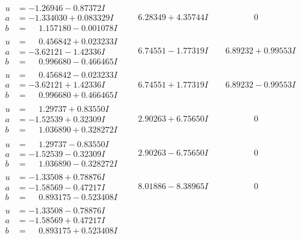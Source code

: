 \documentclass[1p]{elsarticle_modified}
\theoremstyle{definition}
\begin{document}
$$\begin{array}{c|c|c}
\begin{aligned}
u &= -1.26946 - 0.87372 I \\
a &= -1.334030 + 0.083329 I \\
b &= \phantom{-}1.157180 - 0.001078 I\end{aligned}
 & \phantom{-}6.28349 + 4.35744 I & \phantom{-0.000000 } 0 \\ \hline\begin{aligned}
u &= \phantom{-}0.456842 + 0.023233 I \\
a &= -3.62121 - 1.42336 I \\
b &= \phantom{-}0.996680 - 0.466465 I\end{aligned}
 & \phantom{-}6.74551 - 1.77319 I & \phantom{-}6.89232 + 0.99553 I \\ \hline\begin{aligned}
u &= \phantom{-}0.456842 - 0.023233 I \\
a &= -3.62121 + 1.42336 I \\
b &= \phantom{-}0.996680 + 0.466465 I\end{aligned}
 & \phantom{-}6.74551 + 1.77319 I & \phantom{-}6.89232 - 0.99553 I \\ \hline\begin{aligned}
u &= \phantom{-}1.29737 + 0.83550 I \\
a &= -1.52539 + 0.32309 I \\
b &= \phantom{-}1.036890 + 0.328272 I\end{aligned}
 & \phantom{-}2.90263 + 6.75650 I & \phantom{-0.000000 } 0 \\ \hline\begin{aligned}
u &= \phantom{-}1.29737 - 0.83550 I \\
a &= -1.52539 - 0.32309 I \\
b &= \phantom{-}1.036890 - 0.328272 I\end{aligned}
 & \phantom{-}2.90263 - 6.75650 I & \phantom{-0.000000 } 0 \\ \hline\begin{aligned}
u &= -1.33508 + 0.78876 I \\
a &= -1.58569 - 0.47217 I \\
b &= \phantom{-}0.893175 - 0.523408 I\end{aligned}
 & \phantom{-}8.01886 - 8.38965 I & \phantom{-0.000000 } 0 \\ \hline\begin{aligned}
u &= -1.33508 - 0.78876 I \\
a &= -1.58569 + 0.47217 I \\
b &= \phantom{-}0.893175 + 0.523408 I\end{aligned}

\end{array}$$
\end{document}
